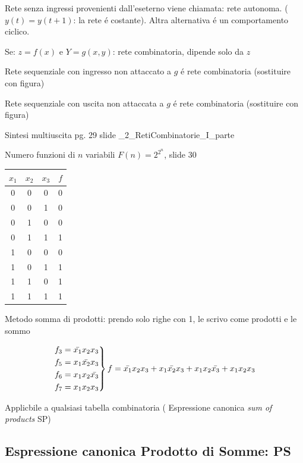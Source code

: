 \documentclass{article}
\begin{document}
Rete senza ingressi provenienti dall'eseterno viene chiamata: rete autonoma.  ($y(t) = y(t+1)$: la rete \'e costante).
Altra alternativa \'e un comportamento ciclico.

Se:
$z = f(x)$ e $Y= g(x, y)$: rete combinatoria, dipende solo da $z$


Rete sequenziale con ingresso non attaccato a $g$ \'e rete combinatoria (sostituire con figura)

Rete sequenziale con uscita non attaccata a $g$ \'e rete combinatoria (sostituire con figura)

Sintesi multiuscita pg. 29 slide \_2\_RetiCombinatorie\_I\_parte

Numero funzioni di $n$ variabili $F(n) = 2^{2^n}$, slide 30

\begin{center}
    \begin{tabular}{c c c|c}
        $x_1$ & $x_2$ & $x_3$ & $f$\\
        \hline{}
        0 & 0 & 0 & 0\\
        0 & 0 & 1 & 0\\
        0 & 1 & 0 & 0\\
        0 & 1 & 1 & 1\\
        \hline{}
        1 & 0 & 0 & 0\\
        1 & 0 & 1 & 1\\
        1 & 1 & 0 & 1\\
        1 & 1 & 1 & 1\\
    \end{tabular}
\end{center}

Metodo somma di prodotti: prendo solo righe con 1, le scrivo come prodotti e le sommo

\[
    \begin{rcases}
        f_3 = \bar{x_1} x_2 x_3\\
        f_5 = x_1 \bar{x_2} x_3\\
        f_6 = x_1 x_2 \bar{x_3}\\
        f_7 = x_1 x_2 x_3
    \end{rcases}
    f =  \bar{x_1} x_2 x_3 + x_1 \bar{x_2} x_3 +  x_1 x_2 \bar{x_3} + x_1 x_2 x_3
\]

Applicbile a qualsiasi tabella combinatoria ( Espressione canonica \textit{sum of products} SP)


\subsection{Espressione canonica Prodotto di Somme: PS}
\end{document}
